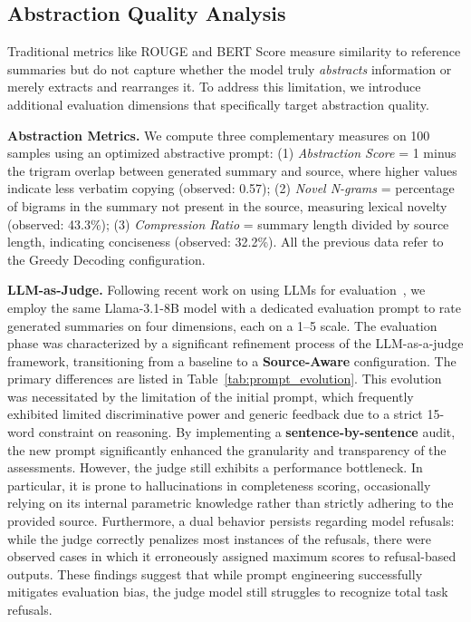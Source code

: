 \documentclass[conference]{IEEEtran}
\begin{document}
\subsection{Abstraction Quality Analysis}

Traditional metrics like ROUGE and BERT Score measure similarity to reference summaries but do not capture whether the model truly \textit{abstracts} information or merely extracts and rearranges it. To address this limitation, we introduce additional evaluation dimensions that specifically target abstraction quality.

\textbf{Abstraction Metrics.} We compute three complementary measures on 100 samples using an optimized abstractive prompt: (1) \textit{Abstraction Score} = 1 minus the trigram overlap between generated summary and source, where higher values indicate less verbatim copying (observed: 0.57); (2) \textit{Novel N-grams} = percentage of bigrams in the summary not present in the source, measuring lexical novelty (observed: 43.3\%); (3) \textit{Compression Ratio} = summary length divided by source length, indicating conciseness (observed: 32.2\%). All the previous data refer to the Greedy Decoding configuration.

\textbf{LLM-as-Judge.} Following recent work on using LLMs for evaluation~\cite{goyal2022news}, we employ the same Llama-3.1-8B model with a dedicated evaluation prompt to rate generated summaries on four dimensions, each on a 1--5 scale. 
The evaluation phase was characterized by a significant refinement process of the LLM-as-a-judge framework, transitioning from a baseline to a \textbf{Source-Aware} configuration. The primary differences are listed in Table~\ref{tab:prompt_evolution}. This evolution was necessitated by the limitation of the initial prompt, which frequently exhibited limited discriminative power and generic feedback due to a strict 15-word constraint on reasoning. By implementing a \textbf{sentence-by-sentence} audit, the new prompt significantly enhanced the granularity and transparency of the assessments. However, the judge still exhibits a performance bottleneck. In particular, it is prone to hallucinations in completeness scoring, occasionally relying on its internal parametric knowledge rather than strictly adhering to the provided source. Furthermore, a dual behavior persists regarding model refusals: while the judge correctly penalizes most instances of the refusals, there were observed cases in which it erroneously assigned maximum scores to refusal-based outputs. These findings suggest that while prompt engineering successfully mitigates evaluation bias, the judge model still struggles to recognize total task refusals.
\end{document}

